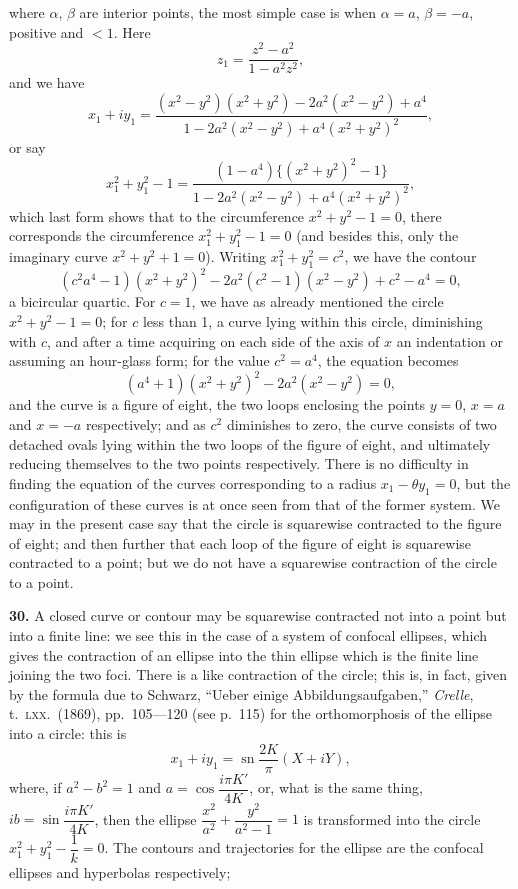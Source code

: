 \documentclass[11pt,a4paper]{article}
\providecommand{\sn}{\operatorname{sn}}
\begin{document}
where $\alpha$, $\beta$ are interior points, the most simple case is when $\alpha = a$, $\beta = -a$, positive and $< 1$. Here
\[
z_1 = \frac{z^2 - a^2}{1 - a^2 z^2},
\]
and we have
\[
x_1 + i y_1 = \frac{(x^2 - y^2)(x^2 + y^2) - 2 a^2 (x^2 - y^2) + a^4}{1 - 2 a^2 (x^2 - y^2) + a^4 (x^2 + y^2)^2},
\]
or say
\[
x_1^2 + y_1^2 - 1 = \frac{(1 - a^4)\{(x^2 + y^2)^2 - 1\}}{1 - 2a^2(x^2 - y^2) + a^4(x^2 + y^2)^2},
\]
which last form shows that to the circumference $x^2 + y^2 - 1 = 0$, there corresponds the circumference $x_1^2 + y_1^2 - 1 = 0$ (and besides this, only the imaginary curve $x^2 + y^2 + 1 = 0$). Writing $x_1^2 + y_1^2 = c^2$, we have the contour
\[
(c^2 a^4 - 1)(x^2 + y^2)^2 - 2 a^2 (c^2 - 1)(x^2 - y^2) + c^2 - a^4 = 0,
\]
a bicircular quartic. For $c = 1$, we have as already mentioned the circle $x^2 + y^2 - 1 = 0$; for $c$ less than 1, a curve lying within this circle, diminishing with $c$, and after a time acquiring on each side of the axis of $x$ an indentation or assuming an hour-glass form; for the value $c^2 = a^4$, the equation becomes
\[
(a^4 + 1)(x^2 + y^2)^2 - 2 a^2 (x^2 - y^2) = 0,
\]
and the curve is a figure of eight, the two loops enclosing the points $y = 0$, $x = a$ and $x = -a$ respectively; and as $c^2$ diminishes to zero, the curve consists of two detached ovals lying within the two loops of the figure of eight, and ultimately reducing themselves to the two points respectively. There is no difficulty in finding the equation of the curves corresponding to a radius $x_1 - \theta y_1 = 0$, but the configuration of these curves is at once seen from that of the former system. We may in the present case say that the circle is squarewise contracted to the figure of eight; and then further that each loop of the figure of eight is squarewise contracted to a point; but we do not have a squarewise contraction of the circle to a point.

\textbf{30.} A closed curve or contour may be squarewise contracted not into a point but into a finite line: we see this in the case of a system of confocal ellipses, which gives the contraction of an ellipse into the thin ellipse which is the finite line joining the two foci. There is a like contraction of the circle; this is, in fact, given by the formula due to Schwarz, ``Ueber einige Abbildungsaufgaben,'' \textit{Crelle}, t.~\textsc{lxx}.\ (1869), pp.\ 105---120 (see p.~115) for the orthomorphosis of the ellipse into a circle: this is
\[
x_1 + i y_1 = \sn\frac{2K}{\pi}(X + iY),
\]
where, if $a^2 - b^2 = 1$ and $a = \cos\dfrac{i\pi K'}{4K}$, or, what is the same thing, $ib = \sin\dfrac{i\pi K'}{4K}$, then the ellipse $\dfrac{x^2}{a^2} + \dfrac{y^2}{a^2 - 1} = 1$ is transformed into the circle $x_1^2 + y_1^2 - \dfrac{1}{k} = 0$. The contours and trajectories for the ellipse are the confocal ellipses and hyperbolas respectively;
\end{document}
